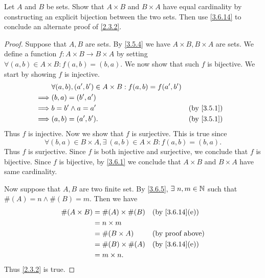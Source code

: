 \begin{ex}\label{ex:3.6.5}
  Let \(A\) and \(B\) be sets.
  Show that \(A \times B\) and \(B \times A\) have equal cardinality by constructing an explicit bijection between the two sets.
  Then use \cref{3.6.14} to conclude an alternate proof of \cref{2.3.2}.
\end{ex}

\begin{proof}
  Suppose that \(A, B\) are sets.
  By \cref{3.5.4} we have \(A \times B, B \times A\) are sets.
  We define a function \(f : A \times B \to B \times A\) by setting \(\forall (a, b) \in A \times B : f(a, b) = (b, a)\).
  We now show that such \(f\) is bijective.
  We start by showing \(f\) is injective.
  \begin{align*}
             & \forall (a, b), (a', b') \in A \times B : f(a, b) = f(a', b')                 \\
    \implies & (b, a) = (b', a')                                                             \\
    \implies & b = b' \land a = a'                                           &  & \by{3.5.1} \\
    \implies & (a, b) = (a', b').                                            &  & \by{3.5.1}
  \end{align*}
  Thus \(f\) is injective.
  Now we show that \(f\) is surjective.
  This is true since
  \[
    \forall (b, a) \in B \times A, \exists\ (a, b) \in A \times B : f(a, b) = (b, a).
  \]
  Thus \(f\) is surjective.
  Since \(f\) is both injective and surjective, we conclude that \(f\) is bijective.
  Since \(f\) is bijective, by \cref{3.6.1} we conclude that \(A \times B\) and \(B \times A\) have same cardinality.

  Now suppose that \(A, B\) are two finite set.
  By \cref{3.6.5}, \(\exists\ n, m \in \N\) such that \(\#(A) = n \land \#(B) = m\).
  Then we have
  \begin{align*}
    \#(A \times B) & = \#(A) \times \#(B) &  & \text{(by \cref{3.6.14}(e))} \\
                   & = n \times m                                           \\
                   & = \#(B \times A)     &  & \text{(by proof above)}      \\
                   & = \#(B) \times \#(A) &  & \text{(by \cref{3.6.14}(e))} \\
                   & = m \times n.
  \end{align*}
  Thus \cref{2.3.2} is true.
\end{proof}

